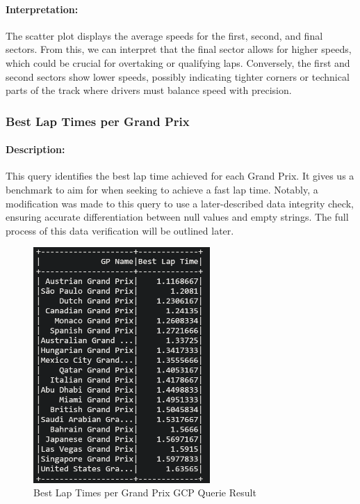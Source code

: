 \documentclass{article}
\begin{document}
\paragraph{Interpretation:}
The scatter plot displays the average speeds for the first, second, and final sectors. From this, we can interpret that the final sector allows for higher speeds, which could be crucial for overtaking or qualifying laps. Conversely, the first and second sectors show lower speeds, possibly indicating tighter corners or technical parts of the track where drivers must balance speed with precision.

\subsubsection{Best Lap Times per Grand Prix}
\paragraph{Description:}
This query identifies the best lap time achieved for each Grand Prix. It gives us a benchmark to aim for when seeking to achieve a fast lap time. Notably, a modification was made to this query to use a later-described data integrity check, ensuring accurate differentiation between null values and empty strings. The full process of this data verification will be outlined later.

\begin{figure}[H]
    \centering
    \includegraphics[width=0.6\textwidth]{bestt-lap-times.png}
    \caption{Best Lap Times per Grand Prix GCP Querie Result}
\end{figure}
\end{document}
